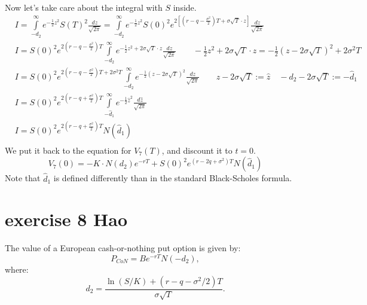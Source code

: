 \documentclass{article}
\begin{document}
Now let's take care about the integral with $S$ inside.
\begin{align}
     & I=\int\limits_{-{{d}_{2}}}^{\infty }{{{e}^{-\frac{1}{2}{{z}^{2}}}}S{{\left( T \right)}^{2}}\frac{dz}{\sqrt{2\pi }}}=\int\limits_{-{{d}_{2}}}^{\infty }{{{e}^{-\frac{1}{2}{{z}^{2}}}}S{{\left( 0 \right)}^{2}}{{e}^{2\left[ \left( r-q-\frac{{{\sigma }^{2}}}{2} \right)T+\sigma \sqrt{T}\cdot z \right]}}\frac{dz}{\sqrt{2\pi }}} \\
     & I=S{{\left( 0 \right)}^{2}}{{e}^{2\left( r-q-\frac{{{\sigma }^{2}}}{2} \right)T}}\int\limits_{-{{d}_{2}}}^{\infty }{{{e}^{-\frac{1}{2}{{z}^{2}}+2\sigma \sqrt{T}\cdot z}}\frac{dz}{\sqrt{2\pi }}}\qquad -\frac{1}{2}{{z}^{2}}+2\sigma \sqrt{T}\cdot z=-\frac{1}{2}{{\left( z-2\sigma \sqrt{T} \right)}^{2}}+2{{\sigma }^{2}}T     \\
     & I=S{{\left( 0 \right)}^{2}}{{e}^{2\left( r-q-\frac{{{\sigma }^{2}}}{2} \right)T+2{{\sigma }^{2}}T}}\int\limits_{-{{d}_{2}}}^{\infty }{{{e}^{-\frac{1}{2}{{\left( z-2\sigma \sqrt{T} \right)}^{2}}}}\frac{dz}{\sqrt{2\pi }}}\qquad z-2\sigma \sqrt{T}:=\hat{z}\quad -{{d}_{2}}-2\sigma \sqrt{T}:=-{{{\hat{d}}}_{1}}                \\
     & I=S{{\left( 0 \right)}^{2}}{{e}^{2\left( r-q+\frac{{{\sigma }^{2}}}{2} \right)T}}\int\limits_{-{{{\hat{d}}}_{1}}}^{\infty }{{{e}^{-\frac{1}{2}{{{\hat{z}}}^{2}}}}\frac{d\hat{z}}{\sqrt{2\pi }}}                                                                                                                                   \\
     & I=S{{\left( 0 \right)}^{2}}{{e}^{2\left( r-q+\frac{{{\sigma }^{2}}}{2} \right)T}}N\left( {{{\hat{d}}}_{1}} \right)                                                                                                                                                                                                                \\
\end{align}
We put it back to the equation for $V_7(T)$, and discount it to $t=0$.
\[{{V}_{7}}\left( 0 \right)=-K\cdot N\left( {{d}_{2}} \right) e^{-rT} +S{{\left( 0 \right)}^{2}}{{e}^{\left( r - 2q + {\sigma }^{2} \right)T}}N\left( {{{\hat{d}}}_{1}} \right)\]
Note that $\hat{d}_1$ is defined differently than in the standard Black-Scholes formula.


\section{exercise 8 Hao}
The value of a European cash-or-nothing put option is given by:
\[
    P_{CoN} = B e^{-rT} N(-d_2),
\]
where:
\[
    d_2 = \frac{\ln(S/K) + (r - q - \sigma^2/2)T}{\sigma \sqrt{T}}.
\]
\end{document}
